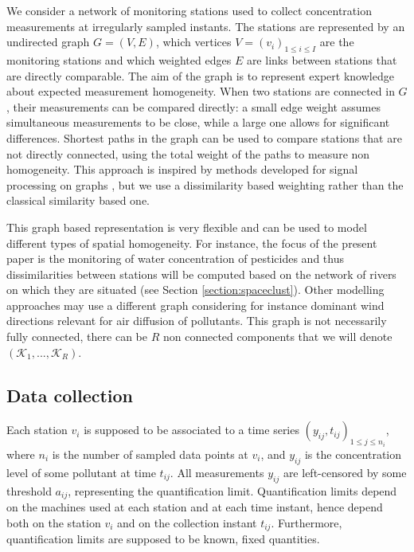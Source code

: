 We consider a network of monitoring stations used to collect concentration measurements at irregularly sampled instants. The stations are represented by an undirected graph $G=(V, E)$, which vertices $V=(v_i)_{1\leq i\leq I}$ are the monitoring stations and which weighted edges $E$ are links between stations that are directly comparable. The aim of the graph is to represent expert knowledge about expected measurement homogeneity. When two stations are connected in $G$, their measurements can be compared directly: a small edge weight assumes simultaneous measurements to be close, while a large one allows for significant differences. Shortest paths in the graph can be used to compare stations that are not directly connected, using the total weight of the paths to measure non homogeneity. This approach is inspired by methods developed for signal processing on graphs \cite{6494675}, but we use a dissimilarity based weighting rather than the classical similarity based one. 

This graph based representation is very flexible and can be used to model different types of spatial homogeneity. For instance, the focus of the present paper is the monitoring of water concentration of pesticides and thus dissimilarities between stations will be computed based on the network of rivers on which they are situated (see Section \ref{section:spaceclust}). Other modelling approaches may use a different graph considering for instance dominant wind directions relevant for air diffusion of pollutants. This graph is not necessarily fully connected, there can be $R$ non connected components that we will denote $(\mathcal{K}_1,...,\mathcal{K}_R)$.

\subsection{Data collection}\label{subsection:data:collection}

Each station $v_i$ is supposed to be associated to a time series $(y_{ij},t_{ij})_{1\leq j\leq n_i}$, where $n_i$ is the number of sampled data points at $v_i$, and $y_{ij}$ is the concentration level of some pollutant at time $t_{ij}$. All measurements $y_{ij}$ are left-censored by some threshold $a_{ij}$, representing the quantification limit. Quantification limits depend on the machines used at each station and at each time instant, hence depend both on the station $v_i$ and on the collection instant $t_{ij}$. Furthermore, quantification limits are supposed to be known, fixed quantities. 

